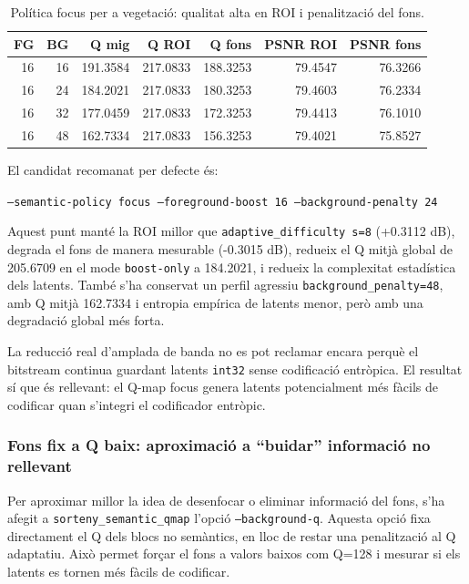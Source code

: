 \documentclass[11pt,a4paper]{article}
\begin{document}
\begin{table}[H]
\centering
\begin{tabular}{rrrrrrr}
\toprule
\textbf{FG} & \textbf{BG} & \textbf{Q mig} & \textbf{Q ROI} & \textbf{Q fons} & \textbf{PSNR ROI} & \textbf{PSNR fons} \\
\midrule
16 & 16 & 191.3584 & 217.0833 & 188.3253 & 79.4547 & 76.3266 \\
16 & 24 & 184.2021 & 217.0833 & 180.3253 & 79.4603 & 76.2334 \\
16 & 32 & 177.0459 & 217.0833 & 172.3253 & 79.4413 & 76.1010 \\
16 & 48 & 162.7334 & 217.0833 & 156.3253 & 79.4021 & 75.8527 \\
\bottomrule
\end{tabular}
\caption{Política focus per a vegetació: qualitat alta en ROI i penalització del fons.}
\end{table}

El candidat recomanat per defecte és:

\begin{center}
\texttt{--semantic-policy focus --foreground-boost 16 --background-penalty 24}
\end{center}

Aquest punt manté la ROI millor que \texttt{adaptive\_difficulty s=8} (+0.3112 dB), degrada el fons de manera mesurable (-0.3015 dB), redueix el Q mitjà global de 205.6709 en el mode \texttt{boost-only} a 184.2021, i redueix la complexitat estadística dels latents. També s'ha conservat un perfil agressiu \texttt{background\_penalty=48}, amb Q mitjà 162.7334 i entropia empírica de latents menor, però amb una degradació global més forta.

La reducció real d'amplada de banda no es pot reclamar encara perquè el bitstream continua guardant latents \texttt{int32} sense codificació entròpica. El resultat sí que és rellevant: el Q-map focus genera latents potencialment més fàcils de codificar quan s'integri el codificador entròpic.

\subsubsection{Fons fix a Q baix: aproximació a ``buidar'' informació no rellevant}

Per aproximar millor la idea de desenfocar o eliminar informació del fons, s'ha afegit a \texttt{sorteny\_semantic\_qmap} l'opció \texttt{--background-q}. Aquesta opció fixa directament el Q dels blocs no semàntics, en lloc de restar una penalització al Q adaptatiu. Això permet forçar el fons a valors baixos com Q=128 i mesurar si els latents es tornen més fàcils de codificar.
\end{document}
